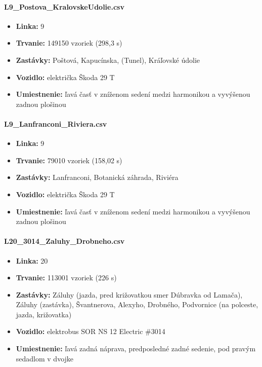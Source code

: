 \paragraph{L9\_Postova\_KralovskeUdolie.csv}
\begin{itemize}[noitemsep, topsep=0pt]
  	\item \textbf{Linka:} 9
  	\item \textbf{Trvanie:} 149150 vzoriek (298,3 s)
  	\item \textbf{Zastávky:} Poštová, Kapucínska, (Tunel), Kráľovské údolie
  	\item \textbf{Vozidlo:} električka Škoda 29 T
  	\item \textbf{Umiestnenie:} ľavá časť v zníženom sedení medzi harmonikou a vyvýšenou zadnou plošinou
\end{itemize}
  		
\paragraph{L9\_Lanfranconi\_Riviera.csv}
\begin{itemize}[noitemsep, topsep=0pt]
  	\item \textbf{Linka:} 9
  	\item \textbf{Trvanie:} 79010 vzoriek (158,02 s)
  	\item \textbf{Zastávky:} Lanfranconi, Botanická záhrada, Riviéra
  	\item \textbf{Vozidlo:} električka Škoda 29 T
  	\item \textbf{Umiestnenie:} ľavá časť v zníženom sedení medzi harmonikou a vyvýšenou zadnou plošinou
\end{itemize}

\paragraph{L20\_3014\_Zaluhy\_Drobneho.csv}
	\begin{itemize}[noitemsep, topsep=0pt]
  	\item \textbf{Linka:} 20
  	\item \textbf{Trvanie:} 113001 vzoriek (226 s)
  	\item \textbf{Zastávky:} Záluhy (jazda, pred križovatkou smer Dúbravka od Lamača), Záluhy (zastávka), Švantnerova, Alexyho, Drobného, Podvornice (na polceste, jazda, križovatka)
  	\item \textbf{Vozidlo:} elektrobus SOR NS 12 Electric \#3014
  	\item \textbf{Umiestnenie:} ľavá zadná náprava, predposledné zadné sedenie, pod pravým sedadlom v dvojke
  	\end{itemize}
  	
